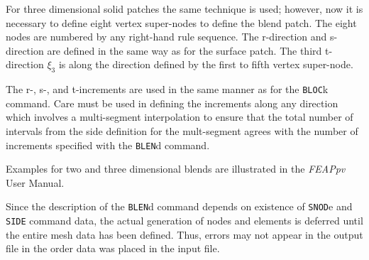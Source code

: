For three dimensional solid patches the same technique is used; however, now
it is necessary to define eight vertex super-nodes to define the blend
patch.  The eight nodes are numbered by any right-hand rule sequence.
The r-direction and s-direction are defined in the same way as for the
surface patch.  The third t-direction ${\xi_3}$ is along the direction defined
by the first to fifth vertex super-node.

The r-, s-, and t-increments are used in the same manner as for the {\tt BLOC}k
command.  Care must be used in defining the increments along any direction
which involves a multi-segment interpolation to ensure that the total number
of intervals from the side definition for the mult-segment agrees with the
number of increments specified with the {\tt BLEN}d command.

Examples for two and three dimensional blends are illustrated in the {\sl FEAPpv}
User Manual.

Since the description of the {\tt BLEN}d command depends on existence of 
{\tt SNOD}e and {\tt SIDE} command data, the actual generation of nodes and
elements is deferred until the entire mesh data has been defined.  Thus,
errors may not appear in the output file in the order data was placed in the
input file.
\vfil\eject
